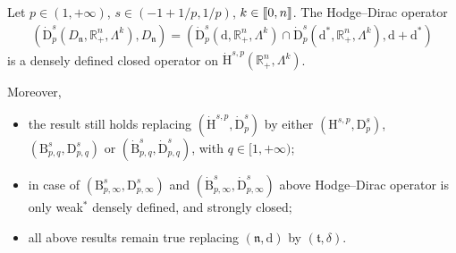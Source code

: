 \documentclass[10pt]{amsart}
\theoremstyle{definition}\newtheorem{defi}[theo]{Definition}\newtheorem{rema}[theo]{Remark}\newtheorem{exam}[theo]{Example}\newtheorem{exem}[theo]{Example}\newtheorem{nota}[theo]{Notation}
\newcommand{\bbR}{\mathbb{R}}
\newcommand{\rmH}{\mathrm{H}}%
\newcommand{\rmB}{\mathrm{B}}
\newcommand{\rmd}{\mathrm{d}}
\newcommand{\rmD}{\mathrm{D}}
\newcommand{\fkn}{\mathfrak{n}}
\newcommand{\fkt}{\mathfrak{t}}
\newcommand{\llbracket}{\mathopen{[\mkern -2.7mu[}}
\newcommand{\rrbracket}{\mathclose{]\mkern -2.7mu]}}
\newcommand{\llb}{\llbracket}
\newcommand{\rrb}{\rrbracket}
\begin{document}
\begin{prop}\label{prop2.27}
Let $p\in(1,+\infty)$, $s\in(-1+1/p,1/p)$, $k\in\llb 0,n \rrb$. The Hodge--Dirac operator
\begin{align*}
\left(\dot{\rmD}^{s}_{p}\left(D_\fkn,\bbR^n_+,\Lambda^k\right),D_\fkn\right)=
\left(\dot{\rmD}^{s}_{p}\left(\rmd,\bbR^n_+,\Lambda^k\right)\cap \dot{\rmD}^{s}_{p}\left(\rmd^\ast,\bbR^n_+,\Lambda^k\right),\rmd+\rmd^\ast\right)
\end{align*}
is a densely defined closed operator on $\dot{\rmH}^{s,p}(\bbR^n_+,\Lambda^k)$.

Moreover,
\begin{itemize}
\item the result still holds replacing $(\dot{\rmH}^{s,p},\dot{\rmD}^{s}_{p})$ by either $({\rmH}^{s,p},{\rmD}^{s}_{p})$, $(\rmB^{s}_{p,q},\rmD^{s}_{p,q})$ or $(\dot{\rmB}^{s}_{p,q},\dot{\rmD}^{s}_{p,q})$, with $q\in[1,+\infty)$;

\item in case of $(\rmB^{s}_{p,\infty},\rmD^{s}_{p,\infty})$ and $(\dot{\rmB}^{s}_{p,\infty},\dot{\rmD}^{s}_{p,\infty})$ above Hodge--Dirac operator is only weak${}^\ast$ densely defined, and strongly closed;

\item all above results remain true replacing $(\fkn,\rmd)$ by $(\fkt,\delta)$.
\end{itemize}
\end{prop}
\end{document}
